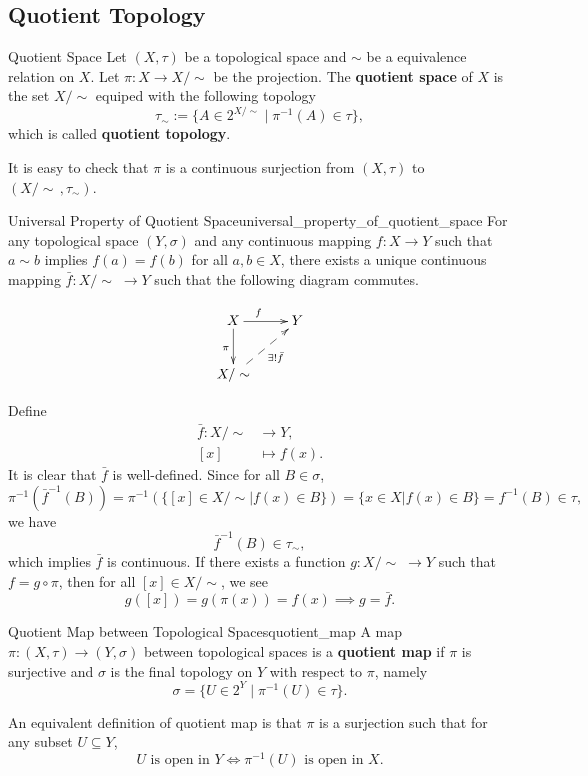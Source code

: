 \documentclass{report}
\begin{document}
\subsection{Quotient Topology}
\begin{definition}{Quotient Space}{}
	Let $(X,\tau)$ be a topological space and $\sim$ be a equivalence relation on $X$. Let $\pi:X\to X/\sim$ be the projection.
	The \textbf{quotient space} of $X$ is the set $X/\sim$ equiped with the following topology
	\[
		\tau_\sim:=\{A\in 2^{X/\sim}\mid \pi^{-1}(A)\in \tau\},
	\]
	which is called \textbf{quotient topology}.
\end{definition}


It is easy to check that $\pi$ is a continuous surjection from $(X,\tau)$ to $(X/\sim\,,\tau_\sim)$.

\begin{proposition}{Universal Property of Quotient Space}{universal_property_of_quotient_space}
	For any topological space $(Y,\sigma)$ and any continuous mapping $f:X\to Y$ such that $a\sim b$ implies $f(a) = f(b)$ for all $a,b \in X$, there exists a unique continuous mapping $\bar{f}:X/\sim\;\to Y$ such that the following diagram commutes.

	\[\xymatrix{
		X\ar[r]^{f\quad}\ar[d]_{\pi}  &Y\\
		X/\sim\ar@{-->}[ru]_{\exists!\bar{f}}&
		}\]
\end{proposition}



\begin{prf}
	Define
	\begin{align*}
		\bar{f}:X/\sim & \longrightarrow Y, \\
		[x]            & \longmapsto f(x).
	\end{align*}
	It is clear that $\bar{f}$ is well-defined. Since for all $B\in \sigma$,
	\[
		\pi^{-1}\left(\bar{f}^{-1}(B)\right)=\pi^{-1}\left(\{[x]\in X/\sim| f(x)\in B\}\right)=\{x\in X| f(x)\in B\}=f^{-1}(B)\in \tau,
	\]
	we have
	\[
		\bar{f}^{-1}(B)\in \tau_\sim,
	\]
	which implies $\bar{f}$ is continuous. If there exists a function $g:X/\sim\;\to Y$ such that $f=g\circ\pi$, then for all $[x]\in X/\sim$, we see
	\[
		g([x])=g(\pi(x))=f(x)\implies g=\bar{f}.
	\]
\end{prf}

\begin{definition}{Quotient Map between Topological Spaces}{quotient_map}
	A map $\pi:(X,\tau)\to (Y,\sigma)$ between topological spaces is a \textbf{quotient map} if $\pi$ is surjective and $\sigma$ is the final topology on $Y$ with respect to $\pi$, namely
	\[
	\sigma=\{U\in 2^Y\mid \pi^{-1}(U)\in \tau\}.
	\]
\end{definition}
\begin{remark}
	An equivalent definition of quotient map is that $\pi$ is a surjection such that for any subset $U\subseteq Y$, 
	\[
	U\text{ is open in }Y \iff \pi^{-1}(U)\text{ is open in }X.
	\]
\end{remark}
\end{document}
